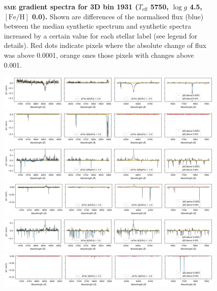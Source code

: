 \documentclass[
  journal=pasa,
  manuscript=research-paper, %
  year=2021,
  volume=37,
]{cup-journal}
\newcommand{\Teff}{$T_\mathrm{eff}$\xspace}
\newcommand{\logg}{$\log g$\xspace}
\newcommand{\feh}{$\mathrm{[Fe/H]}$\xspace}
\newcommand{\sme}{\textsc{sme}\xspace}
\begin{document}
\begin{figure}[h!]
 \caption{\textbf{\sme gradient spectra for 3D bin 1931 (\Teff 5750, \logg 4.5, \feh 0.0).} Shown are differences of the normalised flux (blue) between the median synthetic spectrum and synthetic spectra increased by a certain value for each stellar label (see legend for details). Red dots indicate pixels where the absolute change of flux was above 0.0001, orange ones those pixels with changes above 0.001.
} \label{fig:gradient_spectra_1931_1}
\end{figure}

\begin{figure}[hbt!]
 \centering  
 \includegraphics[width=\textwidth]{figures/gradient_spectrum_1931_o_fe.png}
 \includegraphics[width=\textwidth]{figures/gradient_spectrum_1931_na_fe.png}
 \includegraphics[width=\textwidth]{figures/gradient_spectrum_1931_mg_fe.png}
 \includegraphics[width=\textwidth]{figures/gradient_spectrum_1931_al_fe.png}
 \includegraphics[width=\textwidth]{figures/gradient_spectrum_1931_si_fe.png}
 \includegraphics[width=\textwidth]{figures/gradient_spectrum_1931_k_fe.png}

\end{figure}
\end{document}
